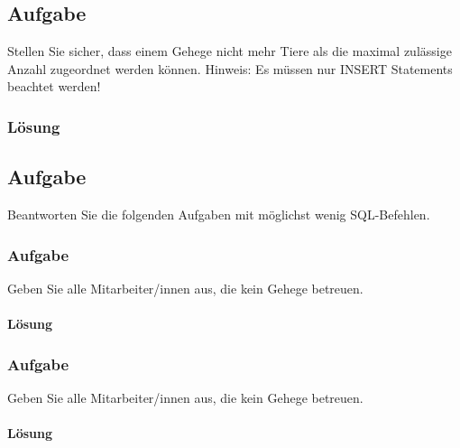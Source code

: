 \subsection{Aufgabe}
\label{subsec:uebung_01.aufgabe_09}
Stellen Sie sicher, dass einem Gehege nicht mehr Tiere als die maximal zulässige Anzahl zugeordnet werden können.
Hinweis: Es müssen nur INSERT Statements beachtet werden!

\subsubsection*{Lösung}
\label{subsubsec:uebung_01.aufgabe_9.loesung}


\subsection{Aufgabe}
\label{subsec:uebung_01.aufgabe_10}
Beantworten Sie die folgenden Aufgaben mit möglichst wenig SQL-Befehlen.

\subsubsection{Aufgabe}
\label{subsec:uebung_01.aufgabe_10a}
Geben Sie alle Mitarbeiter/innen aus, die kein Gehege betreuen.

\paragraph*{Lösung}
\label{subsubsec:uebung_01.aufgabe_10a.loesung}

\subsubsection{Aufgabe}
\label{subsec:uebung_01.aufgabe_10b}
Geben Sie alle Mitarbeiter/innen aus, die kein Gehege betreuen.

\paragraph*{Lösung}
\label{subsubsec:uebung_01.aufgabe_10b.loesung}

